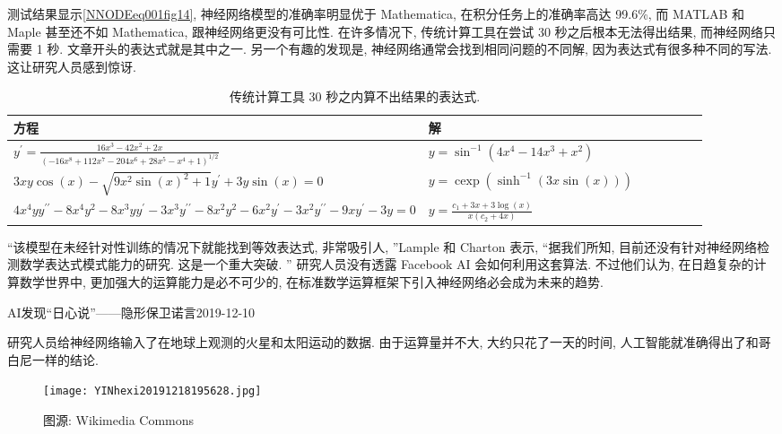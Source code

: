 测试结果显示\ref{NNODEeq001fig14}, 神经网络模型的准确率明显优于 Mathematica, 在积分任务上的准确率高达 99.6\%, 而 MATLAB 和 Maple 甚至还不如 Mathematica, 跟神经网络更没有可比性.
在许多情况下, 传统计算工具在尝试 30 秒之后根本无法得出结果, 而神经网络只需要 1 秒. 文章开头的表达式就是其中之一.
另一个有趣的发现是, 神经网络通常会找到相同问题的不同解, 因为表达式有很多种不同的写法. 这让研究人员感到惊讶.
\begin{table}[thbp]
\begin{center}
\caption{传统计算工具 30 秒之内算不出结果的表达式.}
\begin{tabular}{p{10.5cm}lccccl}
\toprule
方程&解\\
\toprule
$y^{\prime}=\frac{16 x^{3}-42 x^{2}+2 x}{\left(-16 x^{8}+112 x^{7}-204 x^{6}+28 x^{5}-x^{4}+1\right)^{1 / 2}}$&$y=\sin ^{-1}\left(4 x^{4}-14 x^{3}+x^{2}\right)$\\
$3 x y \cos (x)-\sqrt{9 x^{2} \sin (x)^{2}+1} y^{\prime}+3 y \sin (x)=0$&$y=\operatorname{c\exp}\left(\sinh ^{-1}(3 x \sin (x))\right)$\\
$4 x^{4} y y^{\prime \prime}-8 x^{4} y^{2}-8 x^{3} y y^{\prime}-3 x^{3} y^{\prime \prime}-8 x^{2} y^{2}-6 x^{2} y^{\prime}-3 x^{2} y^{\prime \prime}-9 x y^{\prime}-3 y=0$&$\displaystyle y=\frac{c_{1}+3 x+3 \log (x)}{x\left(c_{2}+4 x\right)}$\\
\bottomrule
\end{tabular}
\label{NNODEeq001fig15}
\end{center}
\end{table}
“该模型在未经针对性训练的情况下就能找到等效表达式, 非常吸引人, ”Lample 和 Charton 表示, “据我们所知, 目前还没有针对神经网络检测数学表达式模式能力的研究. 这是一个重大突破. ”
研究人员没有透露 Facebook AI 会如何利用这套算法. 不过他们认为, 在日趋复杂的计算数学世界中, 更加强大的运算能力是必不可少的, 在标准数学运算框架下引入神经网络必会成为未来的趋势.
\begin{example}
AI发现“日心说”——隐形保卫诺言2019-12-10

研究人员给神经网络输入了在地球上观测的火星和太阳运动的数据. 由于运算量并不大, 大约只花了一天的时间, 人工智能就准确得出了和哥白尼一样的结论.
\end{example}
\begin{figure}[H]
\centering
\texttt{[image: YINhexi20191218195628.jpg]}
\caption{图源: Wikimedia Commons}
\label{YINhexi20191218195628fig15}
\end{figure}

